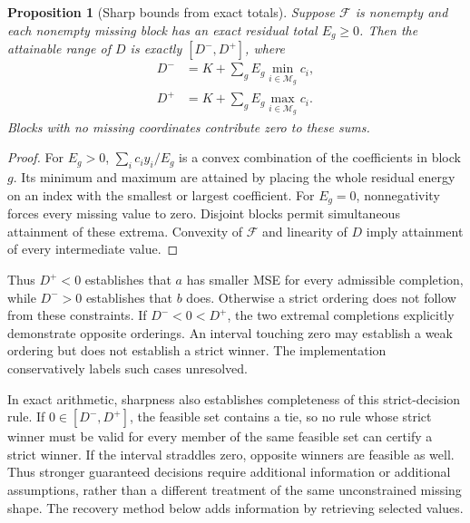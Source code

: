 \documentclass[12pt]{article}
\newtheorem{proposition}{Proposition}
\newcommand{\F}{\mathcal{F}}
\newcommand{\M}{\mathcal{M}}
\begin{document}
\begin{proposition}[Sharp bounds from exact totals]
Suppose $\F$ is nonempty and each nonempty missing block has an exact
residual total $E_g\geq0$. Then the attainable range of $D$ is exactly
$[D^-,D^+]$, where
\begin{align}
 D^-&=K+\sum_g E_g\min_{i\in\M_g}c_i,\label{eq:sharpmin}\\
 D^+&=K+\sum_g E_g\max_{i\in\M_g}c_i.
 \label{eq:sharp}
\end{align}
Blocks with no missing coordinates contribute zero to these sums.
\end{proposition}
\begin{proof}
For $E_g>0$, $\sum_i c_i y_i/E_g$ is a convex combination of the
coefficients in block $g$. Its minimum and maximum are attained by placing
the whole residual energy on an index with the smallest or largest
coefficient. For $E_g=0$, nonnegativity forces every missing value to zero.
Disjoint blocks permit simultaneous attainment of these extrema. Convexity
of $\F$ and linearity of $D$ imply attainment of every intermediate value.
\end{proof}

Thus $D^+<0$ establishes that $a$ has smaller MSE for every admissible
completion, while $D^->0$ establishes that $b$ does. Otherwise a strict
ordering does not follow from these constraints. If $D^-<0<D^+$,
the two extremal completions explicitly demonstrate opposite orderings.
An interval touching zero may establish a weak ordering but does not
establish a strict winner. The implementation conservatively labels such
cases unresolved.

In exact arithmetic, sharpness also establishes completeness of this
strict-decision rule.
If $0\in[D^-,D^+]$, the feasible set contains a tie, so no rule whose
strict winner must be valid for every member of the same feasible set can
certify a strict winner. If the interval straddles zero, opposite winners
are feasible as well. Thus stronger guaranteed decisions require additional
information or additional assumptions, rather than a different treatment
of the same unconstrained missing shape. The recovery method below adds
information by retrieving selected values.
\end{document}
